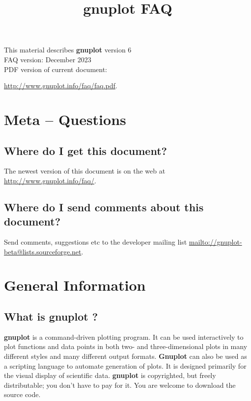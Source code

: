 \documentclass[letter,11pt]{article}
\def\http#1{{\small\href{http://#1}{\url{http://#1}}}}
\def\mailto#1{{\small\href{mailto://#1}{\url{mailto://#1}}}}
\newcommand{\mailto}[1]%
            {\htmladdnormallink{\latex{\url{<#1>}}\html{\textit{#1}}}%
                {mailto:#1}%
            }
\newcommand{\http}[1]%
            {\htmladdnormallink{\latex{\url{http://#1}}%
                    \html{\textit{http://#1}}}%
                {http://#1}%
            }
\newcommand{\gnuplot}{\textbf{gnuplot }}
\newcommand{\Gnuplot}{\textbf{Gnuplot }}
\begin{document}
\title{\gnuplot FAQ}
\author{}
\date{}
\maketitle

\noindent
This material describes \gnuplot version 6
        \\
FAQ version: December 2023
        \\
PDF version of current document: {\http{www.gnuplot.info/faq/faq.pdf}.


\tableofcontents

\newpage
\setcounter{section}{-1}
\section{Meta -- Questions}

\subsection{Where do I get this document?}

The newest version of this document is on the web at
\http{www.gnuplot.info/faq/}.

\subsection{Where do I send comments about this document?}

Send comments, suggestions etc to the developer mailing list
\mailto{gnuplot-beta@lists.sourceforge.net}.

\section{General Information}

\subsection{What is \gnuplot?}

\gnuplot is a command-driven plotting program.
It can be used interactively to plot functions and data points in
both two- and three-dimensional plots in many different styles and
many different output formats.  \Gnuplot can also be used as a
scripting language to automate generation of plots.
It is designed primarily for the visual display of scientific data.
\gnuplot is copyrighted, but freely distributable;
you don't have to pay for it. You are welcome to download the source code.


}
\end{document}
